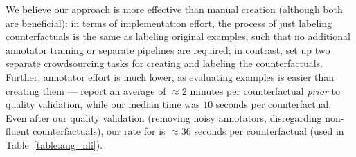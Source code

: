We believe our approach is more effective than manual creation (although both are beneficial): in terms of implementation effort, the process of just labeling counterfactuals is the same as labeling original examples, such that no additional annotator training or separate pipelines are required; in contrast, \citet{kaushik2019learning} set up two separate crowdsourcing tasks for creating and labeling the counterfactuals.
Further, annotator effort is much lower, as evaluating examples is easier than creating them --- \citet{kaushik2019learning} report an average of ${\approx}2$ minutes per \nli counterfactual \emph{prior} to quality validation, while our median time was $10$ seconds per counterfactual. Even after our quality validation (removing noisy annotators, disregarding non-fluent counterfactuals), our rate for \nli is ${\approx}36$ seconds per counterfactual (used in Table~\ref{table:aug_nli}).


